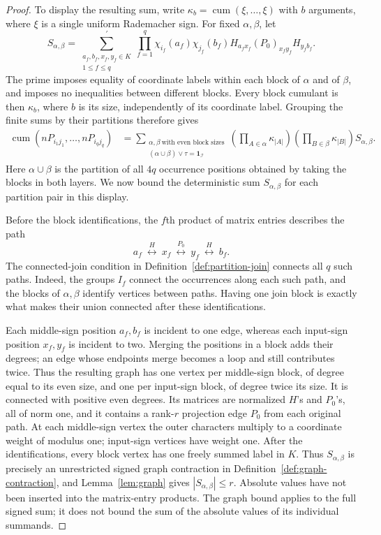 \documentclass[11pt]{article}
\theoremstyle{definition}
\theoremstyle{remark}
\theoremstyle{plain}
\newcommand{\one}{\mathbf 1}
\DeclareMathOperator{\cum}{cum}
\begin{document}
\begin{proof}
To display the resulting sum, write
$\kappa_b=\cum(\xi,\ldots,\xi)$ with $b$ arguments, where $\xi$
is a single uniform Rademacher sign. For fixed $\alpha,\beta$, let
\[
 S_{\alpha,\beta}
 =\sum_{\substack{a_f,b_f,x_f,y_f\in K\\1\le f\le q}}^{\prime}
   \prod_{f=1}^q
   \chi_{i_f}(a_f)\chi_{j_f}(b_f)
   H_{a_fx_f}(P_0)_{x_fy_f}H_{y_fb_f}.
\]
The prime imposes equality of coordinate labels within each block
of $\alpha$ and of $\beta$, and imposes no inequalities between
different blocks. Every block cumulant is then $\kappa_b$, where
$b$ is its size, independently of its coordinate label. Grouping
the finite sums by their partitions therefore gives
\[
 \begin{aligned}
 \cum(nP_{i_1j_1},\ldots,nP_{i_qj_q})
 &=\sum_{\substack{\alpha,\beta\ \text{with even block sizes}\\
             (\alpha\cup\beta)\vee\tau=\one_{\mathcal I}}}
   \left(\prod_{A\in\alpha}\kappa_{|A|}\right)
   \left(\prod_{B\in\beta}\kappa_{|B|}\right)
   S_{\alpha,\beta}.
 \end{aligned}
\]
Here $\alpha\cup\beta$ is the partition of all $4q$ occurrence
positions obtained by taking the blocks in both layers. We now
bound the deterministic sum $S_{\alpha,\beta}$ for each partition
pair in this display.

Before the block identifications, the $f$th product of matrix
entries describes the path
\[
 a_f\ \overset{H}{\longleftrightarrow}\ x_f
 \ \overset{P_0}{\longleftrightarrow}\ y_f
 \ \overset{H}{\longleftrightarrow}\ b_f.
\]
The connected-join condition in
Definition~\ref{def:partition-join} connects all $q$ such paths.
Indeed, the groups $I_f$ connect the occurrences
along each such path, and the blocks of $\alpha,\beta$ identify
vertices between paths. Having one join block is exactly what
makes their union connected after these identifications.

Each middle-sign position $a_f,b_f$ is incident to one edge, whereas
each input-sign position $x_f,y_f$ is incident to two. Merging the
positions in a block adds their degrees; an edge whose endpoints
merge becomes a loop and still contributes twice. Thus the resulting
graph has one vertex per middle-sign block, of degree equal to its
even size, and one per input-sign block, of degree twice its size.
It is connected with positive even degrees. Its matrices are
normalized \(H\)'s and \(P_0\)'s, all of norm one, and it contains
a rank-$r$ projection edge $P_0$ from each original path.
At each middle-sign vertex the outer characters multiply to a
coordinate weight of modulus one; input-sign vertices have weight one.
After the identifications, every block vertex has one freely summed
label in $K$. Thus $S_{\alpha,\beta}$ is precisely an unrestricted
signed graph contraction in Definition~\ref{def:graph-contraction},
and Lemma~\ref{lem:graph} gives $|S_{\alpha,\beta}|\le r$.
Absolute values have not been inserted into the matrix-entry products.
The graph bound applies to the full signed sum; it does not bound
the sum of the absolute values of its individual summands.


\end{proof}
\end{document}
